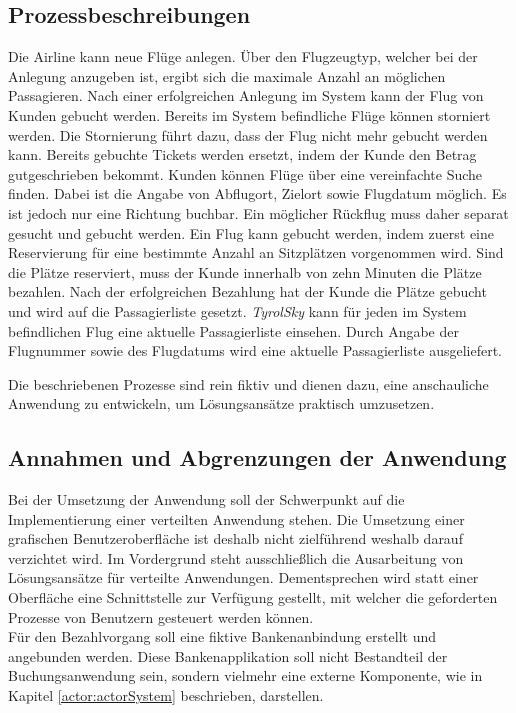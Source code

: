 \subsection{Prozessbeschreibungen}
\begin{enumerate}
   Die Airline kann neue Flüge anlegen. Über den Flugzeugtyp, welcher bei der Anlegung anzugeben ist, ergibt sich die maximale Anzahl an möglichen Passagieren. Nach einer erfolgreichen Anlegung im System kann der Flug von Kunden gebucht werden.
   Bereits im System befindliche Flüge können storniert werden. Die Stornierung führt dazu, dass der Flug nicht mehr gebucht werden kann. Bereits gebuchte Tickets werden ersetzt, indem der Kunde den Betrag gutgeschrieben bekommt.
  Kunden können Flüge über eine vereinfachte Suche finden. Dabei ist die Angabe von Abflugort, Zielort sowie Flugdatum möglich. Es ist jedoch nur eine Richtung buchbar. Ein möglicher Rückflug muss daher separat gesucht und gebucht werden. 
  Ein Flug kann gebucht werden, indem zuerst eine Reservierung für eine bestimmte Anzahl an Sitzplätzen vorgenommen wird. Sind die Plätze reserviert, muss der Kunde innerhalb von zehn Minuten die Plätze bezahlen. Nach der erfolgreichen Bezahlung hat der Kunde die Plätze gebucht und wird auf die Passagierliste gesetzt. 
  \textit{TyrolSky} kann für jeden im System befindlichen Flug eine aktuelle Passagierliste einsehen. Durch Angabe der Flugnummer sowie des Flugdatums wird eine aktuelle Passagierliste ausgeliefert.
\end{enumerate}
Die beschriebenen Prozesse sind rein fiktiv und dienen dazu, eine anschauliche Anwendung zu entwickeln, um Lösungsansätze praktisch umzusetzen. 

\subsection{Annahmen und Abgrenzungen der Anwendung}
Bei der Umsetzung der Anwendung soll der Schwerpunkt auf die Implementierung einer verteilten Anwendung stehen. Die Umsetzung einer grafischen Benutzeroberfläche ist deshalb nicht zielführend weshalb darauf verzichtet wird. Im Vordergrund steht ausschließlich die Ausarbeitung von Lösungsansätze für verteilte Anwendungen. Dementsprechen wird statt einer Oberfläche eine Schnittstelle zur Verfügung gestellt, mit welcher die geforderten Prozesse von Benutzern gesteuert werden können. \\
Für den Bezahlvorgang soll eine fiktive Bankenanbindung erstellt und angebunden werden. Diese Bankenapplikation soll nicht Bestandteil der Buchungsanwendung sein, sondern vielmehr eine externe Komponente, wie in Kapitel \ref{actor:actorSystem} beschrieben, darstellen. 

